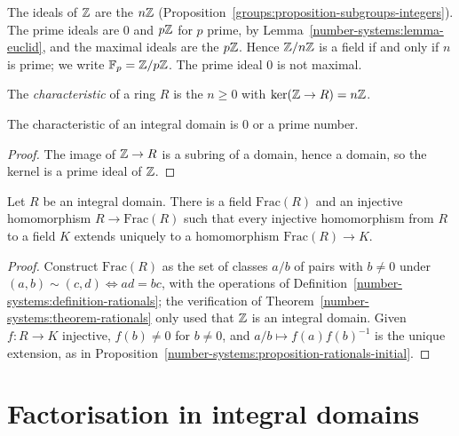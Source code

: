 \begin{example}\label{rings:example-ideals-integers}
The ideals of $\mathbb{Z}$ are the $n\mathbb{Z}$ (Proposition~\ref{groups:proposition-subgroups-integers}).
The prime ideals are $0$ and $p\mathbb{Z}$ for $p$ prime, by
Lemma~\ref{number-systems:lemma-euclid}, and the maximal ideals are the $p\mathbb{Z}$. Hence
$\mathbb{Z}/n\mathbb{Z}$ is a field if and only if $n$ is prime; we write $\mathbb{F}_p = \mathbb{Z}/p\mathbb{Z}$. The
prime ideal $0$ is not maximal.
\end{example}

\begin{definition}\label{rings:definition-characteristic}
The \emph{characteristic} of a ring $R$ is the $n \geq 0$ with $\ker(\mathbb{Z} \to R) = n\mathbb{Z}$.
\end{definition}

\begin{lemma}\label{rings:lemma-characteristic-domain}
The characteristic of an integral domain is $0$ or a prime number.
\end{lemma}

\begin{proof}
The image of $\mathbb{Z} \to R$ is a subring of a domain, hence a domain, so the kernel
is a prime ideal of $\mathbb{Z}$.
\end{proof}

\begin{proposition}\label{rings:proposition-fraction-field}
Let $R$ be an integral domain. There is a field $\mathrm{Frac}(R)$ and an injective
homomorphism $R \to \mathrm{Frac}(R)$ such that every injective homomorphism from $R$
to a field $K$ extends uniquely to a homomorphism $\mathrm{Frac}(R) \to K$.
\end{proposition}

\begin{proof}
Construct $\mathrm{Frac}(R)$ as the set of classes $a/b$ of pairs with $b \neq 0$
under $(a, b) \sim (c, d) \iff ad = bc$, with the operations of
Definition~\ref{number-systems:definition-rationals}; the verification of
Theorem~\ref{number-systems:theorem-rationals} only used that $\mathbb{Z}$ is an integral
domain. Given $f \colon R \to K$ injective, $f(b) \neq 0$ for $b \neq 0$, and
$a/b \mapsto f(a)f(b)^{-1}$ is the unique extension, as in
Proposition~\ref{number-systems:proposition-rationals-initial}.
\end{proof}

\section{Factorisation in integral domains}\label{rings:section-factorisation}

